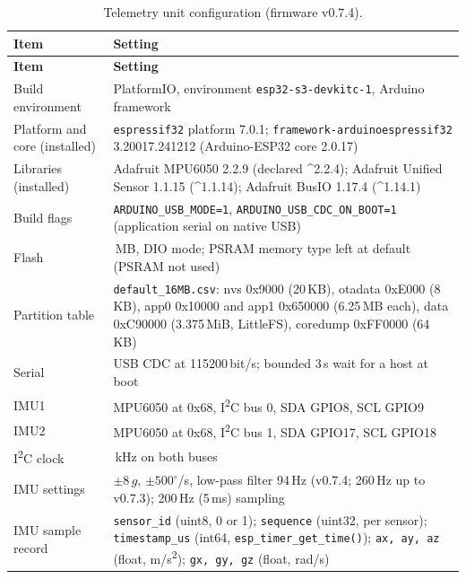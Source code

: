 \begin{longtable}{|>{\raggedright\arraybackslash}p{4.0cm}|>{\raggedright\arraybackslash}p{9.8cm}|}
\caption[Telemetry unit configuration (firmware v0.7.4)]{Telemetry unit configuration (firmware v0.7.4).}
\label{tab:config}\\
\hline
\textbf{Item} & \textbf{Setting} \\ \hline
\endfirsthead
\hline
\textbf{Item} & \textbf{Setting} \\ \hline
\endhead
Build environment & PlatformIO, environment \texttt{esp32-s3-devkitc-1}, Arduino framework \\ \hline
Platform and core (installed) & \texttt{espressif32} platform 7.0.1; \texttt{framework-arduinoespressif32} 3.20017.241212 (Arduino-ESP32 core 2.0.17) \\ \hline
Libraries (installed) & Adafruit MPU6050 2.2.9 (declared \^{}2.2.4); Adafruit Unified Sensor 1.1.15 (\^{}1.1.14); Adafruit BusIO 1.17.4 (\^{}1.14.1) \\ \hline
Build flags & \texttt{ARDUINO\_USB\_MODE=1}, \texttt{ARDUINO\_\allowbreak{}USB\_\allowbreak{}CDC\_\allowbreak{}ON\_\allowbreak{}BOOT=1} (application serial on native USB) \\ \hline
Flash & 16\,MB, DIO mode; PSRAM memory type left at default (PSRAM not used) \\ \hline
Partition table & \texttt{default\_16MB.csv}: nvs 0x9000 (20\,KB), otadata 0xE000 (8\,KB), app0 0x10000 and app1 0x650000 (6.25\,MB each), data 0xC90000 (3.375\,MiB, LittleFS), coredump 0xFF0000 (64\,KB) \\ \hline
Serial & USB CDC at 115200\,bit/s; bounded 3\,s wait for a host at boot \\ \hline
IMU1 & MPU6050 at 0x68, I\textsuperscript{2}C bus 0, SDA GPIO8, SCL GPIO9 \\ \hline
IMU2 & MPU6050 at 0x68, I\textsuperscript{2}C bus 1, SDA GPIO17, SCL GPIO18 \\ \hline
I\textsuperscript{2}C clock & 400\,kHz on both buses \\ \hline
IMU settings & $\pm 8\,g$, $\pm 500^{\circ}$/s, low-pass filter 94\,Hz (v0.7.4; 260\,Hz up to v0.7.3); 200\,Hz (5\,ms) sampling \\ \hline
IMU sample record & \texttt{sensor\_id} (uint8, 0 or 1); \texttt{sequence} (uint32, per sensor); \texttt{timestamp\_us} (int64, \texttt{esp\_timer\_get\_time()}); \texttt{ax, ay, az} (float, m/s\textsuperscript{2}); \texttt{gx, gy, gz} (float, rad/s) \\ \hline

\end{longtable}

